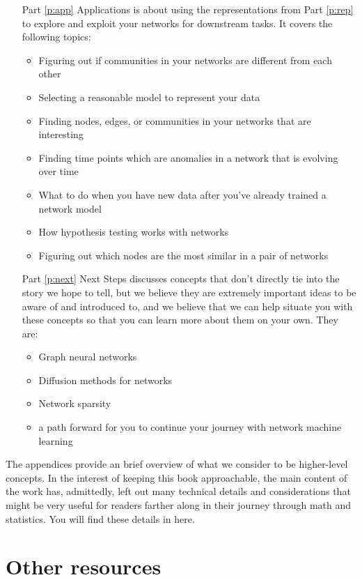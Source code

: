 \begin{itemize}[leftmargin=1cm]
\begin{itemize}
    \end{itemize}
    \item [Part \ref{p:app}] Applications is about using the representations from Part \ref{p:rep} to explore and exploit your networks for downstream tasks. It covers the following topics:
    \begin{itemize}
        \item Figuring out if communities in your networks are different from each other
        \item Selecting a reasonable model to represent your data
        \item Finding nodes, edges, or communities in your networks that are interesting
        \item Finding time points which are anomalies in a network that is evolving over time
        \item What to do when you have new data after you've already trained a network model
        \item How hypothesis testing works with networks
        \item Figuring out which nodes are the most similar in a pair of networks
    \end{itemize}
    \item [Part \ref{p:next}] Next Steps discusses concepts that don't directly tie into the story we hope to tell, but we believe they are extremely important ideas to be aware of and introduced to, and we believe that we can help situate you with these concepts so that you can learn more about them on your own. They are:
    \begin{itemize}
        \item Graph neural networks
        \item Diffusion methods for networks
        \item Network sparsity
        \item a path forward for you to continue your journey with network machine learning
    \end{itemize}
\end{itemize}
The appendices provide an brief overview of what we consider to be higher-level concepts. In the interest of keeping this book approachable, the main content of the work has, admittedly, left out many technical details and considerations that might be very useful for readers farther along in their journey through math and statistics. You will find these details in here.

\section*{Other resources}

